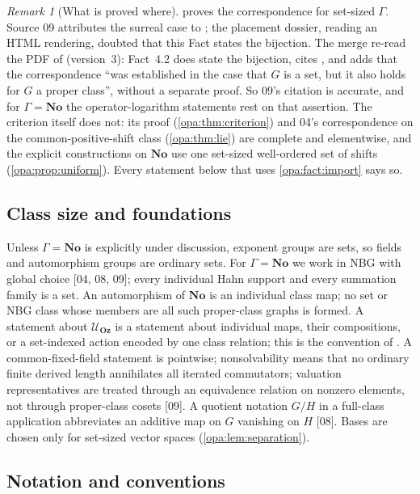 \documentclass[11pt,oneside]{article}
\numberwithin{equation}{section}
\theoremstyle{definition}
\theoremstyle{remark}
\newtheorem{remark}[remark]{Remark}
\newcommand{\No}{\mathbf{No}}
\newcommand{\Oz}{\mathbf{Oz}}
\newcommand{\UU}{\mathcal U}
\newcommand{\src}[1]{\textup{\textsf{\small[#1]}}}
\begin{document}
\begin{remark}[What is proved where]\label{opa:rem:import}
\cite{BKKPS} proves the correspondence for set-sized $\Gamma$. Source 09
attributes the surreal case to \cite[Fact 4.2]{KKS}; the placement dossier,
reading an HTML rendering, doubted that this Fact states the bijection. The
merge re-read the PDF of \cite{KKS} (version~3): Fact~4.2 does state the
bijection, cites \cite[Theorem 3.13]{BKKPS}, and adds that the correspondence
``was established in the case that $G$ is a set, but it also holds for $G$ a
proper class'', without a separate proof. So 09's citation is accurate, and
for $\Gamma=\No$ the operator-logarithm statements rest on that assertion.
The criterion itself does not: its proof (\cref{opa:thm:criterion}) and 04's
correspondence on the common-positive-shift class (\cref{opa:thm:lie}) are
complete and elementwise, and the explicit constructions on $\No$ use one
set-sized well-ordered set of shifts (\cref{opa:prop:uniform}). Every
statement below that uses \cref{opa:fact:import} says so.
\end{remark}

\subsection{Class size and foundations}\label{opa:sub:foundations}

Unless $\Gamma=\No$ is explicitly under discussion, exponent groups are sets,
so fields and automorphism groups are ordinary sets. For $\Gamma=\No$ we work
in NBG with global choice \src{04, 08, 09}; every individual Hahn support and
every summation family is a set. An automorphism of $\No$ is an individual
class map; no set or NBG class whose members are all such proper-class
graphs is formed. A statement about $\UU_\Oz$ is a statement about individual
maps, their compositions, or a set-indexed action encoded by one class
relation; this is the convention of \cite{KKS}. A common-fixed-field
statement is pointwise; nonsolvability means that no ordinary finite derived
length annihilates all iterated commutators; valuation representatives are
treated through an equivalence relation on nonzero elements, not through
proper-class cosets \src{09}. A quotient notation $G/H$ in a full-class
application abbreviates an additive map on $G$ vanishing on $H$ \src{08}.
Bases are chosen only for set-sized vector spaces
(\cref{opa:lem:separation}).

\subsection{Notation and conventions}\label{opa:sub:notation}
\end{document}
